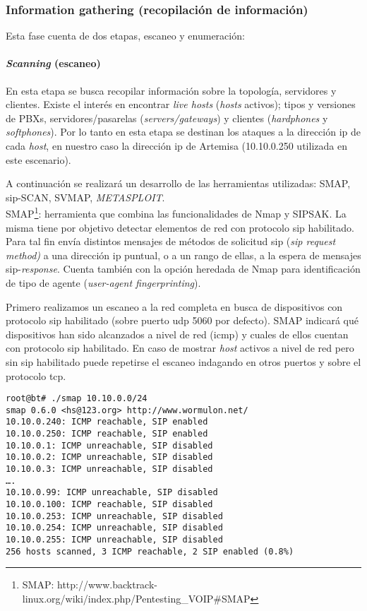 \documentclass[a4paper,12pt]{report}
\newenvironment{myscriptlisting}
{\begin{list}{}{\setlength{\leftmargin}{1em}}\item\scriptsize\bfseries}
{\end{list}}
\begin{document}
\subsubsection{Information gathering (recopilación de información)}
\label{scanning}

Esta fase cuenta de dos etapas, escaneo y enumeración:

\paragraph{\emph{Scanning} (escaneo)\\}
 
En esta etapa se busca recopilar información sobre la topología, servidores y
clientes. Existe el interés en encontrar \emph{live hosts} (\emph{hosts} activos); tipos y
versiones de PBXs, servidores/pasarelas (\emph{servers/gateways}) y clientes
(\emph{hardphones} y \emph{softphones}). Por lo tanto en esta etapa se destinan los ataques a
la dirección \ac{ip} de cada \emph{host}, en nuestro caso la dirección \ac{ip} de Artemisa
(10.10.0.250 utilizada en este escenario).

A continuación se realizará un desarrollo de las herramientas 
utilizadas: SMAP, \ac{sip}-SCAN, SVMAP, \emph{METASPLOIT}.\\

SMAP\footnote{SMAP:
http://www.backtrack-linux.org/wiki/index.php/Pentesting\_VOIP\#SMAP}: 
herramienta que combina las funcionalidades de Nmap y SIPSAK. La misma tiene por
objetivo detectar elementos de red con protocolo \ac{sip} habilitado. Para tal fin
envía distintos mensajes de métodos de solicitud  \ac{sip} (\emph{\ac{sip} request method)} a una
dirección \ac{ip} puntual, o a un rango de ellas, a la espera de mensajes
\ac{sip}-\emph{response}. Cuenta también con la opción heredada de Nmap para identificación
de tipo de agente (\emph{user-agent fingerprinting}).

Primero realizamos un escaneo a la red completa en busca de dispositivos con 
protocolo \ac{sip} habilitado (sobre puerto \ac{udp} 5060 por defecto). SMAP indicará qué
dispositivos han sido alcanzados a nivel de red (\ac{icmp}) y cuales de ellos cuentan
con protocolo \ac{sip} habilitado. En caso de mostrar \emph{host} activos a nivel de red
pero sin \ac{sip} habilitado puede repetirse el escaneo indagando en otros puertos y
sobre el protocolo \ac{tcp}.

\begin{myscriptlisting}
 \begin{verbatim}
root@bt# ./smap 10.10.0.0/24
smap 0.6.0 <hs@123.org> http://www.wormulon.net/
10.10.0.240: ICMP reachable, SIP enabled
10.10.0.250: ICMP reachable, SIP enabled
10.10.0.1: ICMP unreachable, SIP disabled
10.10.0.2: ICMP unreachable, SIP disabled
10.10.0.3: ICMP unreachable, SIP disabled
….
10.10.0.99: ICMP unreachable, SIP disabled
10.10.0.100: ICMP reachable, SIP disabled
10.10.0.253: ICMP unreachable, SIP disabled
10.10.0.254: ICMP unreachable, SIP disabled
10.10.0.255: ICMP unreachable, SIP disabled
256 hosts scanned, 3 ICMP reachable, 2 SIP enabled (0.8%)
 \end{verbatim}
\end{myscriptlisting}
\end{document}
